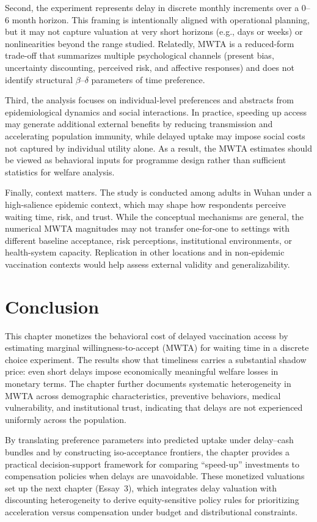 \documentclass[doublespacing]{utdthesis}
\begin{document}
Second, the experiment represents delay in discrete monthly increments over a 0--6 month horizon. This framing is intentionally aligned with operational planning, but it may not capture valuation at very short horizons (e.g., days or weeks) or nonlinearities beyond the range studied. Relatedly, MWTA is a reduced-form trade-off that summarizes multiple psychological channels (present bias, uncertainty discounting, perceived risk, and affective responses) and does not identify structural $\beta$--$\delta$ parameters of time preference.

Third, the analysis focuses on individual-level preferences and abstracts from epidemiological dynamics and social interactions. In practice, speeding up access may generate additional external benefits by reducing transmission and accelerating population immunity, while delayed uptake may impose social costs not captured by individual utility alone. As a result, the MWTA estimates should be viewed as behavioral inputs for programme design rather than sufficient statistics for welfare analysis.

Finally, context matters. The study is conducted among adults in Wuhan under a high-salience epidemic context, which may shape how respondents perceive waiting time, risk, and trust. While the conceptual mechanisms are general, the numerical MWTA magnitudes may not transfer one-for-one to settings with different baseline acceptance, risk perceptions, institutional environments, or health-system capacity. Replication in other locations and in non-epidemic vaccination contexts would help assess external validity and generalizability.

\section{Conclusion}
\label{sec:essay2_conclusion}

This chapter monetizes the behavioral cost of delayed vaccination access by estimating marginal willingness-to-accept (MWTA) for waiting time in a discrete choice experiment. The results show that timeliness carries a substantial shadow price: even short delays impose economically meaningful welfare losses in monetary terms. The chapter further documents systematic heterogeneity in MWTA across demographic characteristics, preventive behaviors, medical vulnerability, and institutional trust, indicating that delays are not experienced uniformly across the population.

By translating preference parameters into predicted uptake under delay--cash bundles and by constructing iso-acceptance frontiers, the chapter provides a practical decision-support framework for comparing ``speed-up'' investments to compensation policies when delays are unavoidable. These monetized valuations set up the next chapter (Essay~3), which integrates delay valuation with discounting heterogeneity to derive equity-sensitive policy rules for prioritizing acceleration versus compensation under budget and distributional constraints.
\clearpage
\end{document}
